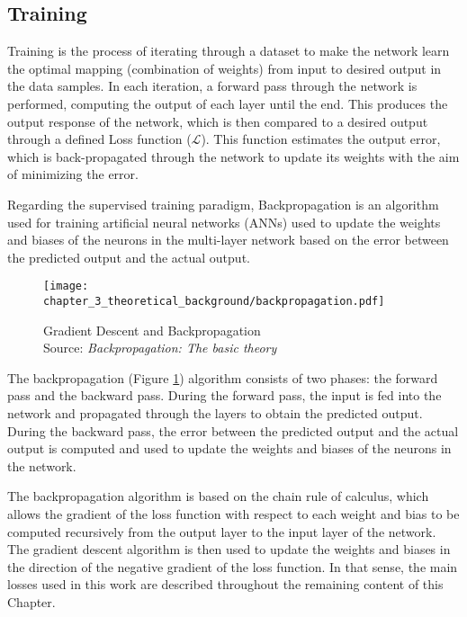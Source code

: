 \subsection{Training}
\label{subsec:3_training}

Training is the process of iterating through a dataset to make the network learn the optimal mapping (combination of weights) from input to desired output in the data samples. In each iteration, a forward pass through the network is performed, computing the output of each layer until the end. This produces the output response of the network, which is then compared to a desired output through a defined Loss function ($\mathcal{L}$). This function estimates the output error, which is back-propagated through the network to update its weights with the aim of minimizing the error. 

Regarding the supervised training paradigm, Backpropagation \cite{rumelhart1995backpropagation} is an algorithm used for training artificial neural networks (ANNs) used to update the weights and biases of the neurons in the multi-layer network based on the error between the predicted output and the actual output.

\begin{figure}[h]
	\centering
	\texttt{[image: chapter\_3\_theoretical\_background/backpropagation.pdf]}
	\caption[Gradient Descent and Backpropagation]{Gradient Descent and Backpropagation \\ 
	Source: \textit{Backpropagation: The basic theory} \cite{rumelhart1995backpropagation}}
	\label{fig:chapter_3_theoretical_background/backpropagation}
\end{figure}

The backpropagation (Figure \ref{fig:chapter_3_theoretical_background/backpropagation}) algorithm consists of two phases: the forward pass and the backward pass. During the forward pass, the input is fed into the network and propagated through the layers to obtain the predicted output. During the backward pass, the error between the predicted output and the actual output is computed and used to update the weights and biases of the neurons in the network.

The backpropagation algorithm is based on the chain rule of calculus, which allows the gradient of the loss function with respect to each weight and bias to be computed recursively from the output layer to the input layer of the network. The gradient descent algorithm is then used to update the weights and biases in the direction of the negative gradient of the loss function. In that sense, the main losses used in this work are described throughout the remaining content of this Chapter.

